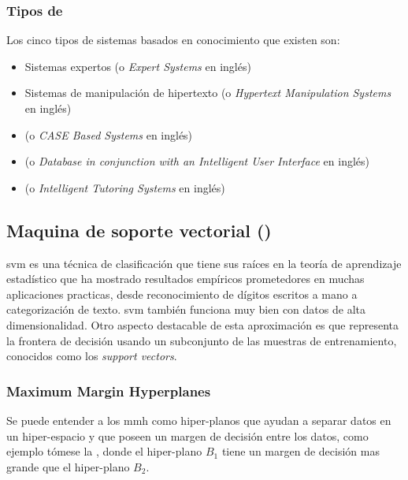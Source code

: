 \subsubsection{Tipos de } \label{ch:kbs-types}
Los cinco tipos de sistemas basados en conocimiento que existen son:
\begin{itemize}
  \item Sistemas expertos (o \textsl{Expert Systems} en inglés)
  \item Sistemas de manipulación de hipertexto (o \textsl{Hypertext Manipulation Systems} en inglés)
  \item (o \textsl{CASE Based Systems} en inglés)
  \item (o \textsl{Database in conjunction with an Intelligent User Interface} en inglés)
  \item (o \textsl{Intelligent Tutoring Systems} en inglés)
\end{itemize}

\subsubsection{} \label{ch:kbs-rule-based-system}


\subsection{Maquina de soporte vectorial ()} \label{sec:SVM}
\gls{svm} es una técnica de clasificación que tiene sus raíces en la teoría de aprendizaje estadístico que ha mostrado resultados empíricos prometedores en muchas aplicaciones practicas, desde reconocimiento de dígitos escritos a mano a categorización de texto. \gls{svm} también funciona muy bien con datos de alta dimensionalidad. Otro aspecto destacable de esta aproximación es que representa la frontera de decisión usando un subconjunto de las muestras de entrenamiento, conocidos como los \emph{support vectors}.

\subsubsection{Maximum Margin Hyperplanes}
Se puede entender a los \gls{mmh} como hiper-planos que ayudan a separar datos en un hiper-espacio y que poseen un margen de decisión entre los datos, como ejemplo tómese la , donde el hiper-plano $B_1$ tiene un margen de decisión mas grande que el hiper-plano $B_2$.

